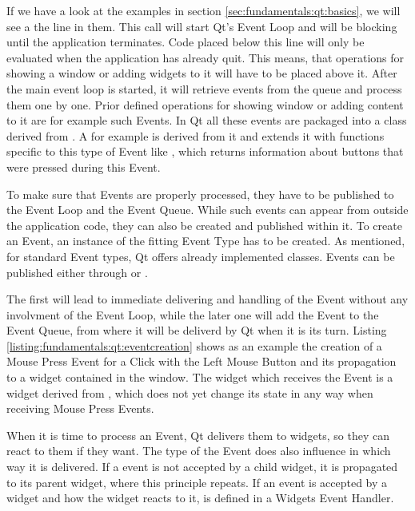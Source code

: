 If we have a look at the examples in section \ref{sec:fundamentals:qt:basics},
we will see a the line  in them. This call will
start Qt's Event Loop and will be blocking until the application terminates.
Code placed below this line will only be evaluated when the application has
already quit. This means, that operations for showing a window or adding widgets
to it will have to be placed above it. After the main event loop is started, it
will retrieve events from the queue and process them one by one. Prior defined
operations for showing window or adding content to it are for example such
Events. In Qt all these events are packaged into a class derived from
. A  for
example is derived from it and extends it with functions specific to this type
of Event like , which returns
information about buttons that were pressed during this Event.

To make sure that Events are properly processed, they have to be published to
the Event Loop and the Event Queue. While such events can appear from outside
the application code, they can also be created and published within it. To
create an Event, an instance of the fitting Event Type has to be created. As
mentioned, for standard Event types, Qt offers already implemented classes.
Events can be published either through
 or
. 

The first will lead to immediate delivering and handling of the Event without
any involvment of the Event Loop, while the later one will add the Event to the
Event Queue, from where it will be deliverd by Qt when it is its turn. Listing
\ref{listing:fundamentals:qt:eventcreation} shows as an example the creation of
a Mouse Press Event for a Click with the Left Mouse Button and its propagation
to a widget contained in the window. The widget which receives the Event is a
widget derived from , which does not yet
change its state in any way when receiving Mouse Press Events.



When it is time to process an Event, Qt delivers them to widgets, so they can
react to them if they want. The type of the Event does also influence in which
way it is delivered. If a event is not accepted by a child widget, it is
propagated to its parent widget, where this principle repeats. If an event is
accepted by a widget and how the widget reacts to it, is defined in a Widgets
Event Handler.

